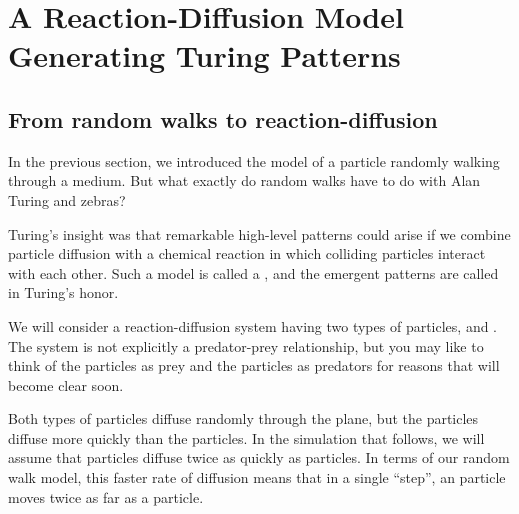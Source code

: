 \FloatBarrier
{}

\section{A Reaction-Diffusion Model Generating Turing Patterns}
\label{sec:a_reaction-diffusion_model_generating_turing_patterns}

\subsection{From random walks to reaction-diffusion}

In the previous section, we introduced the model of a particle randomly walking through a medium. But what exactly do random walks have to do with Alan Turing and zebras?

Turing's insight was that remarkable high-level patterns could arise if we combine particle diffusion with a chemical reaction in which colliding particles interact with each other. Such a model is called a , and the emergent patterns are called  in Turing's honor.

We will consider a reaction-diffusion system having two types of particles,  and . The system is not explicitly a predator-prey relationship, but you may like to think of the  particles as prey and the  particles as predators for reasons that will become clear soon.

Both types of particles diffuse randomly through the plane, but the  particles diffuse more quickly than the  particles.  In the simulation that follows, we will assume that  particles diffuse twice as quickly as  particles. In terms of our random walk model, this faster rate of diffusion means that in a single ``step'', an  particle moves twice as far as a  particle.\\

\begin{qbox}\end{qbox}

